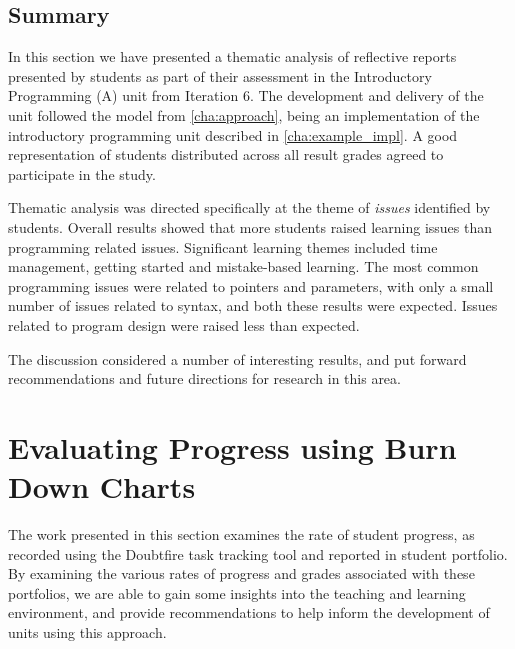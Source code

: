 
\subsection{Summary} %
\label{sub:issues_summary}

In this section we have presented a thematic analysis of reflective reports presented by students as part of their assessment in the Introductory Programming (A) unit from Iteration 6. The development and delivery of the unit followed the model from \cref{cha:approach}, being an implementation of the introductory programming unit described in \cref{cha:example_impl}. A good representation of students distributed across all result grades agreed to participate in the study. 

Thematic analysis was directed specifically at the theme of \emph{issues} identified by students. Overall results showed that more students raised learning issues than programming related issues. Significant learning themes included time management, getting started and mistake-based learning. The most common programming issues were related to pointers and parameters, with only a small number of issues related to syntax, and both these results were expected. Issues related to program design were raised less than expected. 

The discussion considered a number of interesting results, and put forward recommendations and future directions for research in this area. 



\clearpage
\section{Evaluating Progress using Burn Down Charts} %
\label{sec:evaluating_progress_using_burndown_charts}

The work presented in this section examines the rate of student progress, as recorded using the Doubtfire task tracking tool and reported in student portfolio. By examining the various rates of progress and grades associated with these portfolios, we are able to gain some insights into the teaching and learning environment, and provide recommendations to help inform the development of units using this approach. 


